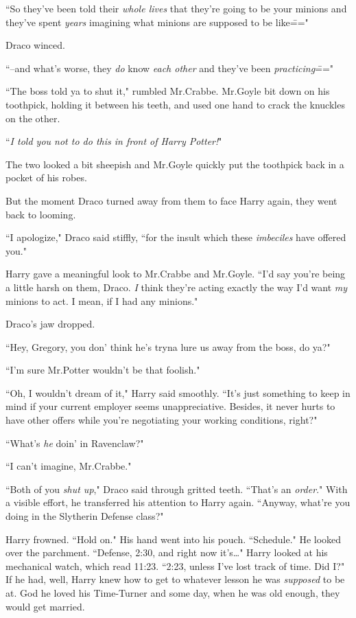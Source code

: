 ``So they've been told their \emph{whole lives} that they're going to be your minions and they've spent \emph{years} imagining what minions are supposed to be like\==="

Draco winced.

``\---and what's worse, they \emph{do} know \emph{each other} and they've been \emph{practicing}\==="

``The boss told ya to shut it," rumbled Mr.\?Crabbe. Mr.\?Goyle bit down on his toothpick, holding it between his teeth, and used one hand to crack the knuckles on the other.

``\emph{I told you not to do this in front of Harry Potter!}"

The two looked a bit sheepish and Mr.\?Goyle quickly put the toothpick back in a pocket of his robes.

But the moment Draco turned away from them to face Harry again, they went back to looming.

``I apologize," Draco said stiffly, ``for the insult which these \emph{imbeciles} have offered you."

Harry gave a meaningful look to Mr.\?Crabbe and Mr.\?Goyle. ``I'd say you're being a little harsh on them, Draco. \emph{I} think they're acting exactly the way I'd want \emph{my} minions to act. I mean, if I had any minions."

Draco's jaw dropped.

``Hey, Gregory, you don' think he's tryna lure us away from the boss, do ya?"

``I'm sure Mr.\?Potter wouldn't be that foolish."

``Oh, I wouldn't dream of it," Harry said smoothly. ``It's just something to keep in mind if your current employer seems unappreciative. Besides, it never hurts to have other offers while you're negotiating your working conditions, right?"

``What's \emph{he} doin' in Ravenclaw?"

``I can't imagine, Mr.\?Crabbe."

``Both of you \emph{shut up}," Draco said through gritted teeth. ``That's an \emph{order}." With a visible effort, he transferred his attention to Harry again. ``Anyway, what're you doing in the Slytherin Defense class?"

Harry frowned. ``Hold on." His hand went into his pouch. ``Schedule." He looked over the parchment. ``Defense, 2:30\pm, and right now it's{\ldots}" Harry looked at his mechanical watch, which read 11:23. ``2:23, unless I've lost track of time. Did I?" If he had, well, Harry knew how to get to whatever lesson he was \emph{supposed} to be at. God he loved his Time-Turner and some day, when he was old enough, they would get married.

